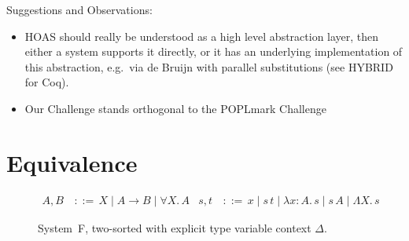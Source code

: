 \documentclass[a4paper,UKenglish]{lipics-v2016}
\makeatletter
\newcommand{\ms}{\,}
\newcommand{\mrel}[1]{\mathrel{\ms #1 \ms}}
\newcommand{\dom}[1]{\ensuremath{\textrm{dom($#1$)}}}
\newcommand{\OF}{\mrel{:}}
\newcommand{\bnfdef}{\mrel{::=}}
\newcommand{\SysF}{\ensuremath{\mathsf{F}}\xspace}
\newcommand{\ty}{\mathsf{ty}}
\newcommand{\tm}{\mathsf{tm}}
\newcommand{\of}{\ensuremath{\!:\!}}
\newcommand{\cc}[2]{#1;#2} %
\newcommand{\raisemath}[1]{\mathpalette{\raisem@th{#1}}}
\newcommand{\raisem@th}[3]{\raisebox{#1}{\ensuremath{#2#3}}}
\newcommand{\tsAnnot}[2]{\vdash\hspace{-.7em}^{\raisemath{1.5pt}{\scriptscriptstyle{#2}}}_{\raisemath{0.3pt}{\scriptscriptstyle{#1}}}} %
\newcommand{\tfF}{\tsAnnot{\SysF}{\ty}}  %
\newcommand{\tyF}{\tsAnnot{\SysF}{\tm}}  %
\newcommand{\istyF}[2]{\ensuremath{{#1} \mathrel{\tfF} #2}}
\newcommand{\typingF}[3]{\ensuremath{{#1} \mathrel{\tyF} #2 \OF #3}}
\newcommand{\nAll}[1]{\ensuremath{\forall #1.\,}}
\newcommand{\Lam}[1]{\ensuremath{\lambda #1.\,}}
\newcommand{\nTyLam}[1]{\ensuremath{\Lambda #1.\,}}
\newcommand{\subst}[1]{\hphantom{|}\!\![{#1}]}
\makeatother
\begin{document}
Suggestions and Observations:
\begin{itemize}
\item HOAS should really be understood as a high level abstraction layer, then either a system supports it directly, or it has an underlying implementation of this abstraction, e.g.\ via de Bruijn with parallel substitutions (see HYBRID for Coq).
\item Our Challenge stands orthogonal to the POPLmark Challenge~\cite{poplmark}
\end{itemize}

\section{Equivalence}
\label{sec:equivalence}

\begin{figure}
  \begin{center}
    \begin{align*}
      A, B &\bnfdef X \mid A \to B \mid \nAll X A & s, t &\bnfdef x \mid s\,t \mid \Lam {x \of A} s \mid s\,A \mid \nTyLam X s
    \end{align*}
  \end{center}
  \caption{System~F, two-sorted with explicit type variable context $\Delta$.}
  \label{fig:sys-f}
\end{figure}
\end{document}
